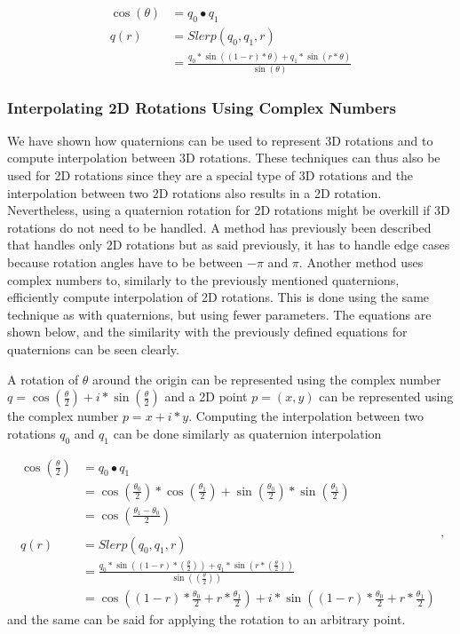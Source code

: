 \begin{equation}
\begin{split}
    \cos(\theta)    & = q_0 \bullet q_1 \\
    q(r)            & = Slerp(q_0, q_1, r) \\
                    & = \frac{q_0 * \sin((1-r)*\theta) + q_1 * \sin(r*\theta)}{\sin(\theta)}
\end{split}
\end{equation}
    
\subsubsection{Interpolating 2D Rotations Using Complex Numbers}

We have shown how quaternions can be used to represent 3D rotations and to compute interpolation between 3D rotations. These techniques can thus also be used for 2D rotations since they are a special type of 3D rotations and the interpolation between two 2D rotations also results in a 2D rotation. Nevertheless, using a quaternion rotation for 2D rotations might be overkill if 3D rotations do not need to be handled. A method has previously been described that handles only 2D rotations but as said previously, it has to handle edge cases because rotation angles have to be between \( - \pi \) and \( \pi \). Another method uses complex numbers to, similarly to the previously mentioned quaternions, efficiently compute interpolation of 2D rotations. This is done using the same technique as with quaternions, but using fewer parameters. The equations are shown below, and the similarity with the previously defined equations for quaternions can be seen clearly.

A rotation of $\theta$ around the origin can be represented using the complex number \( q = \cos(\frac{\theta}{2}) + i*\sin(\frac{\theta}{2}) \) and a 2D point \( p = (x, y) \) can be represented using the complex number \( p = x + i*y \). Computing the interpolation between two rotations \( q_0 \) and \( q_1 \) can be done similarly as quaternion interpolation

\begin{equation}
\begin{split}
\cos(\frac{\theta}{2})  &= q_0 \bullet q_1 \\
                        &= \cos(\frac{\theta_0}{2})*\cos(\frac{\theta_1}{2}) + \sin(\frac{\theta_0}{2})*\sin(\frac{\theta_1}{2}) \\
                        &= \cos(\frac{\theta_1 - \theta_0}{2}) \\
                        & \\
q(r)                &= Slerp(q_0, q_1, r) \\
                &= \frac{q_0 * \sin((1-r)*(\frac{\theta}{2})) + q_1 * \sin(r*(\frac{\theta}{2}))}{\sin((\frac{\theta}{2}))} \\
                &= \cos((1-r)*\frac{\theta_0}{2} + r*\frac{\theta_1}{2}) + i*\sin((1-r)*\frac{\theta_0}{2} + r*\frac{\theta_1}{2})
\end{split}, 
\end{equation}
and the same can be said for applying the rotation to an arbitrary point.

